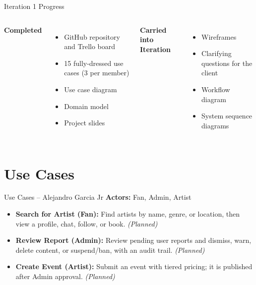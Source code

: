 \documentclass[11pt,aspectratio=169]{beamer}
\newcommand{\iterationNumber}{1} %
\newcounter{nextIter}
\newcommand{\nextIteration}{\thenextIter}
\begin{document}
\begin{frame}{Iteration \iterationNumber{} Progress}
\begin{columns}[T]
\textbf{Completed}
\begin{itemize}
  \item GitHub repository and Trello board
  \item 15 fully-dressed use cases (3 per member)
  \item Use case diagram
  \item Domain model
  \item Project slides
\end{itemize}
\textbf{Carried into Iteration \nextIteration}
\begin{itemize}
  \item Wireframes
  \item Clarifying questions for the client
  \item Workflow diagram
  \item System sequence diagrams
\end{itemize}
\end{columns}
\end{frame}

\section{Use Cases}

\begin{frame}{Use Cases -- Alejandro Garcia Jr}
\textbf{Actors:} Fan, Admin, Artist
\vspace{0.5em}
\begin{itemize}
  \item \textbf{Search for Artist (Fan):} Find artists by name, genre, or location, then view a profile, chat, follow, or book. \textit{(Planned)}
  \item \textbf{Review Report (Admin):} Review pending user reports and dismiss, warn, delete content, or suspend/ban, with an audit trail. \textit{(Planned)}
  \item \textbf{Create Event (Artist):} Submit an event with tiered pricing; it is published after Admin approval. \textit{(Planned)}
\end{itemize}
\end{frame}
\end{document}
